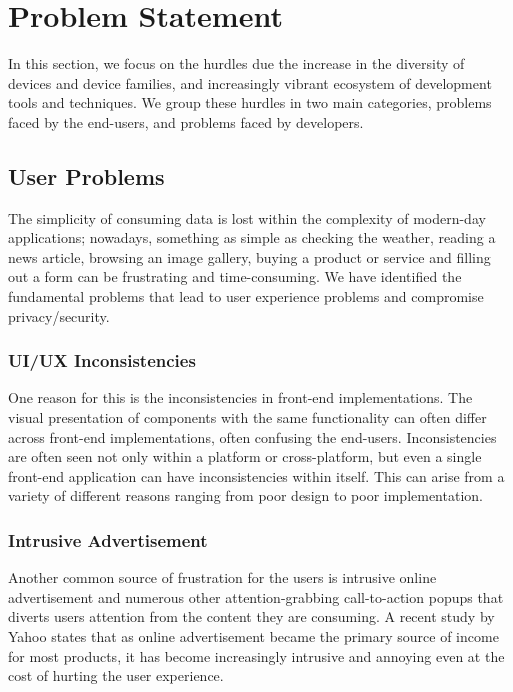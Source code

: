 \section{Problem Statement} \label{problemStatement}

In this section, we focus on the hurdles due the increase in the diversity of devices and device families, and increasingly vibrant ecosystem of development tools and techniques. We group these hurdles in two main categories, problems faced by the end-users, and problems faced by developers.

\subsection{User Problems}

The simplicity of consuming data is lost within the complexity of modern-day applications; nowadays, something as simple as checking the weather, reading a news article, browsing an image gallery, buying a product or service and filling out a form can be frustrating and time-consuming. We have identified the fundamental problems that lead to user experience problems and compromise privacy/security.

\subsubsection{UI/UX Inconsistencies}
One reason for this is the inconsistencies in front-end implementations. The visual presentation of components with the same functionality can often differ across front-end implementations, often confusing the end-users. Inconsistencies are often seen not only within a platform or cross-platform, but even a single front-end application can have inconsistencies within itself. This can arise from a variety of different reasons ranging from poor design to poor implementation.

\subsubsection{Intrusive Advertisement}
Another common source of frustration for the users is intrusive online advertisement and numerous other attention-grabbing call-to-action popups that diverts users attention from the content they are consuming. A recent study by Yahoo \cite{IntrusiveAds} states that as online advertisement became the primary source of income for most products, it has become increasingly intrusive and annoying even at the cost of hurting the user experience.

